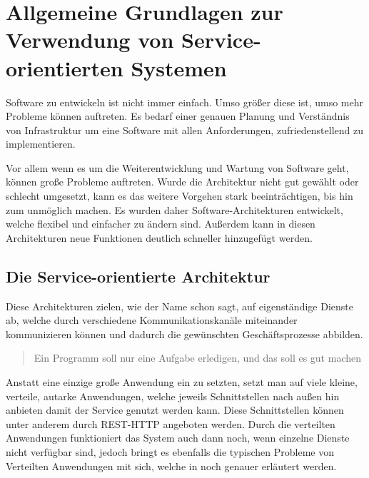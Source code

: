 \chapter[Grundlagen]{Allgemeine Grundlagen zur Verwendung von Service-orientierten Systemen}
\label{chap:grundlagen}
Software zu entwickeln ist nicht immer einfach. Umso größer diese ist, umso mehr Probleme können auftreten. Es bedarf einer genauen Planung und Verständnis von Infrastruktur um eine Software mit allen Anforderungen, zufriedenstellend zu implementieren. 

Vor allem wenn es um die Weiterentwicklung und Wartung von Software geht, können große Probleme auftreten. Wurde die Architektur nicht gut gewählt oder schlecht umgesetzt, kann es das weitere Vorgehen stark beeinträchtigen, bis hin zum unmöglich machen. Es wurden daher Software-Architekturen entwickelt, welche flexibel und einfacher zu ändern sind. Außerdem kann in diesen Architekturen neue Funktionen deutlich schneller hinzugefügt werden.

\section{Die Service-orientierte Architektur}
\label{sec:architektur}
Diese Architekturen zielen, wie der Name schon sagt, auf eigenständige Dienste ab, welche durch verschiedene Kommunikationskanäle miteinander kommunizieren können und dadurch die gewünschten Geschäftsprozesse abbilden. 
\begin{quotation}
    \frqq Ein Programm soll nur eine Aufgabe erledigen, und das soll es gut machen\flqq \cite[S. 2]{EWolff2015:ContinuouosDelivery}
\end{quotation}
Anstatt eine einzige große Anwendung ein zu setzten, setzt man auf viele kleine, verteile, autarke Anwendungen, welche jeweils Schnittstellen nach außen hin anbieten damit der Service genutzt werden kann. Diese Schnittstellen können unter anderem durch REST-HTTP angeboten werden.
Durch die verteilten Anwendungen funktioniert das System auch dann noch, wenn einzelne Dienste nicht verfügbar sind, jedoch bringt es ebenfalls die typischen Probleme von Verteilten Anwendungen mit sich, welche in  noch genauer erläutert werden.

